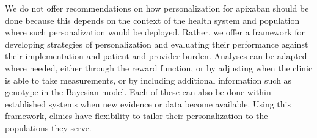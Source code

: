 
We do not offer recommendations on how personalization for apixaban should be done because this depends on the context of the health system and population where such personalization would be deployed. Rather, we offer a framework for developing strategies of personalization and evaluating their performance against their implementation and patient and provider burden.  Analyses can be adapted where needed, either through the reward function, or by adjusting when the clinic is able to take measurements, or by including additional information such as genotype in the Bayesian model. Each of these can also be done within established systems when new evidence or data become available. Using this framework, clinics have flexibility to tailor their personalization to the populations they serve.


